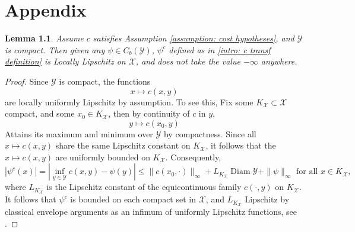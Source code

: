 \documentclass[11pt, oneside, titlepage]{book}
\theoremstyle{plain}
\newtheorem{lemma}[theorem]{Lemma}
\theoremstyle{definition}
\newcommand{\X}{\mathcal{X}}
\newcommand{\Y}{\mathcal{Y}}
\DeclareMathOperator{\diam}{Diam}
\begin{document}



\appendix
\chapter{Appendix}



\begin{lemma}
\label{app: potential regularity}
    Assume $c$ satisfies Assumption \ref{assumption: cost hypotheses}, and $\Y$ is compact. Then given any $\psi \in C_b(\Y)$, $\psi^c$ defined as in \eqref{intro: c transf definition} is Locally Lipschitz on $\X$, and does not take the value $-\infty$ anywhere.
\end{lemma}
\begin{proof}
    Since $\Y$ is compact, the functions
    \begin{equation*}
        x \mapsto c(x, y)
    \end{equation*}
    are locally uniformly Lipschitz by assumption. To see this, Fix some $K_\X \subset \X$ compact, and some $x_0 \in K_\X$, then by continuity of $c$ in $y$, 
    \begin{equation*}
        y \mapsto c(x_0, y)
    \end{equation*}
    Attains its maximum and minimum over $\Y$ by compactness. Since all $x \mapsto c(x, y)$ share the same Lipschitz constant on $K_\X$, it follows that the  $x \mapsto c(x, y)$ are uniformly bounded on $K_\X$. Consequently,
    \begin{equation*}
        |\psi^c(x)| = |\inf_{y \in \Y} c(x, y) - \psi(y)| \leq  \|c(x_0, \cdot)\|_\infty + L_{K_\X}\diam \Y + \|\psi\|_\infty \text{ for all } x \in K_\X,
    \end{equation*}
    where $L_{K_\X}$ is the Lipschitz constant of the equicontinuous family $c( \cdot, y)$ on $K_\X$.
    It follows that $\psi^c$ is bounded on each compact set in $\X$, and $L_{K_\X}$ Lipschitz by classical envelope arguments as an infimum of uniformly Lipschitz functions, see \cite[Box 1.8]{santambrogio2015optimal}.
\end{proof}
\end{document}

